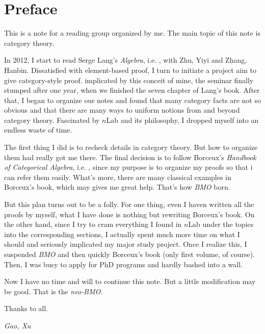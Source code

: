 \chapter*{\giant\Edward Preface}

This is a note for a reading group organized by me. The main topic of this note is category theory.

In 2012, I start to read Serge Lang's \emph{Algebra}, i.e. \cite{lang2002algebra}, with Zhu, Yiyi and Zhang, Hanbin. Dissatisfied with element-based proof, I turn to initiate a project aim to give category-style proof. implicated by this conceit of mine, the seminar finally stumped after one year, when we finished the seven chapter of Lang's book. After that, I began to organize our notes and found that many category facts are not so obvious and that there are many ways to uniform notions from and beyond category theory. Fascinated by $n$Lab and its philosophy, I dropped myself into an endless waste of time.

The first thing I did is to recheck details in category theory. But how to organize them had really got me there. The final decision is to follow Borceux's \emph{Handbook of Categorical Algebra}, i.e. \cite{borceux}, since my purpose is to organize my proofs so that i can refer them easily. What's more, there are many classical examples in Borceux's book, which may gives me great help. That's how \emph{BMO} born.

But this plan turns out to be a folly. For one thing, even I haven written all the proofs by myself, what I have done is nothing but rewriting Borceux's book. On the other hand, since I try to cram everything I found in $n$Lab under the topics into the corresponding sections, I actually spent much more time on what I should and seriously implicated my major study project. Once I realize this, I suspended \emph{BMO} and then quickly Borceux's book (only first volume, of course). Then, I was busy to apply for PhD programs and hardly bashed into a wall.

Now I have no time and will to continue this note. But a little modification may be good. That is the \emph{neo-BMO}.

Thanks to all.

\begin{flushright}
  \emph{Gao, Xu}
\end{flushright}
